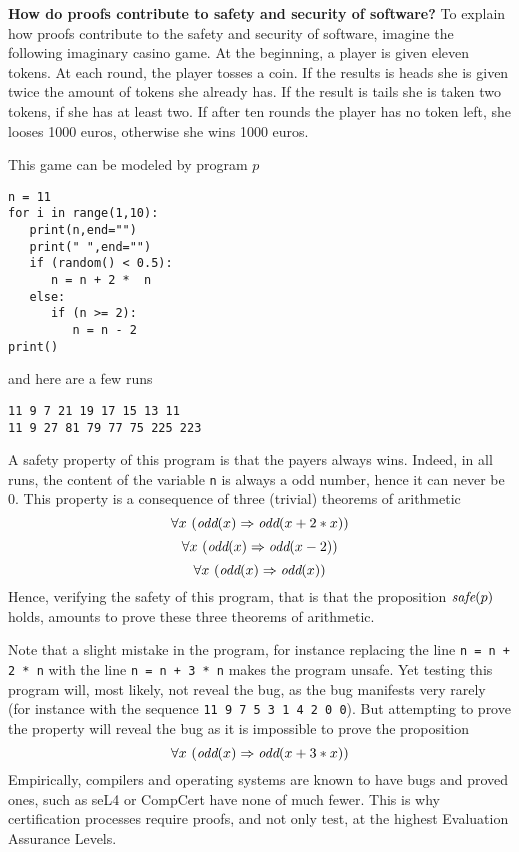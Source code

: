 {\bf How do proofs contribute to safety and security of software?}  To
explain how proofs contribute to the safety and security of software,
imagine the following imaginary casino game. At the beginning, a
player is given eleven tokens. At each round, the player tosses a
coin. If the results is heads she is given twice the amount of tokens
she already has. If the result is tails she is taken two tokens, if
she has at least two.  If after ten rounds the player has no token
left, she looses 1000 euros, otherwise she wins 1000 euros.

This game can be modeled by program $p$
\begin{verbatim}
n = 11
for i in range(1,10):
   print(n,end="")
   print(" ",end="")
   if (random() < 0.5):
      n = n + 2 *  n
   else:
      if (n >= 2):
         n = n - 2
print()
\end{verbatim}
and here are a few runs
\begin{verbatim}
11 9 7 21 19 17 15 13 11
11 9 27 81 79 77 75 225 223 
\end{verbatim}
A safety property of this program is that the payers always wins.
Indeed, in all runs, the content of the variable {\tt n} is always a
odd number, hence it can never be $0$. This property is a consequence
of three (trivial) theorems of arithmetic
$$\forall x~(\mbox{\it odd}(x) \Rightarrow \mbox{\it odd}(x + 2 * x))$$
$$\forall x~(\mbox{\it odd}(x) \Rightarrow \mbox{\it odd}(x - 2))$$
$$\forall x~(\mbox{\it odd}(x) \Rightarrow \mbox{\it odd}(x))$$
Hence, verifying the safety of this program, that is that the
proposition 
${\mbox{\it safe}}(p)$ holds, 
amounts to prove these three theorems of arithmetic.

Note that a slight mistake in the program, for instance replacing the line
{\tt n = n + 2 * n} with the line {\tt n = n + 3 * n} makes the program unsafe.
Yet testing this program will, most likely, not reveal the bug, as the bug
manifests very rarely (for instance with the sequence
{\tt 11 9 7 5 3 1 4 2 0 0}).
But attempting to prove the property will reveal the bug as it is impossible
to prove the proposition
$$\forall x~(\mbox{\it odd}(x) \Rightarrow \mbox{\it odd}(x + 3 * x))$$
Empirically, compilers and operating systems are known to have bugs
and proved ones, such as seL4 or CompCert have none of much fewer.
This is why certification processes require proofs, and not only test,
at the highest Evaluation Assurance Levels.

